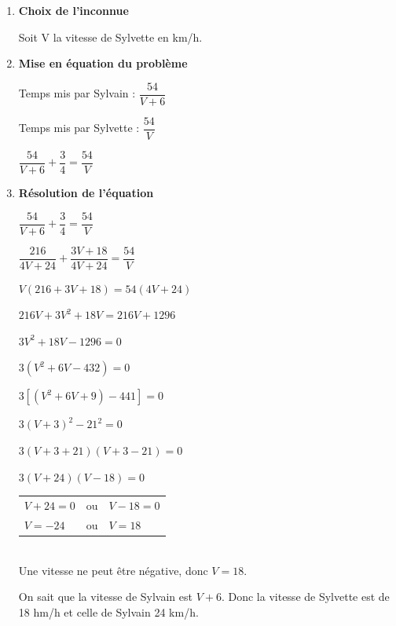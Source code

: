 \begin{enumerate}
\item \textbf{Choix de l'inconnue}

Soit V la vitesse de Sylvette en km/h.

\item \textbf{Mise en équation du problème}

Temps mis par Sylvain : $\dfrac{54}{V+6}$

Temps mis par Sylvette : $\dfrac{54}{V}$

$\dfrac{54}{V+6} + \dfrac{3}{4} = \dfrac{54}{V}$

\item \textbf{Résolution de l'équation}

$\dfrac{54}{V+6} + \dfrac{3}{4} = \dfrac{54}{V}$

$\dfrac{216}{4V+24} + \dfrac{3V+18}{4V+24} = \dfrac{54}{V}$

$V\left(216+3V+18\right)=54\left(4V+24\right) $

$ 216V + 3V^2 + 18V = 216V + 1296 $

$ 3V^2 + 18V -1296 = 0 $

$ 3\left(V^2 + 6V - 432\right)=0 $

$ 3\left[\left(V^2 + 6V +9\right) - 441\right] = 0 $

$ 3\left(V+3\right)^2 - 21^2 = 0 $

$ 3\left(V + 3 + 21 \right)\left(V+3-21\right)=0 $

$ 3\left(V+24\right)\left(V-18\right) = 0 $ \\

\begin{tabular}{lcl}
$V+24 = 0$ & ou &$V-18=0$\\
$V=-24$ & ou &$V=18$\\
\end{tabular} \\

Une vitesse ne peut être négative, donc $V=18$.

On sait que la vitesse de Sylvain est $V+6$. Donc la vitesse de Sylvette est de 18 hm/h et celle de Sylvain 24 km/h.
\end{enumerate}



\ifdefined\COMPLETE
\else
    
\fi